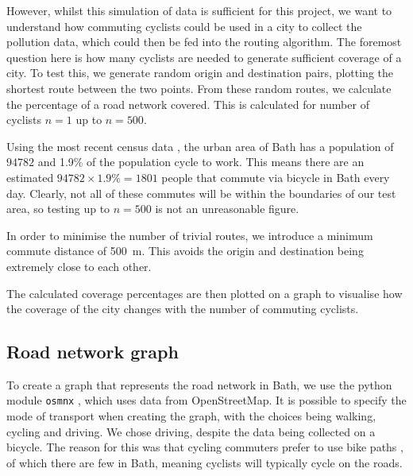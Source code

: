 \documentclass[11pt]{report}
\begin{document}
However, whilst this simulation of data is sufficient for this project, we want to understand how commuting cyclists could be used in a city to collect the pollution data, which could then be fed into the routing algorithm. The foremost question here is how many cyclists are needed to generate sufficient coverage of a city. To test this, we generate random origin and destination pairs, plotting the shortest route between the two points. From these random routes, we calculate the percentage of a road network covered. This is calculated for number of cyclists $n=1$ up to $n=500$.

Using the most recent census data \citep{ons2011census}, the urban area of Bath has a population of $94782$ and 1.9\% of the population cycle to work. This means there are an estimated $94782 \times 1.9\% = 1801$ people that commute via bicycle in Bath every day. Clearly, not all of these commutes will be within the boundaries of our test area, so testing up to $n=500$ is not an unreasonable figure.

In order to minimise the number of trivial routes, we introduce a minimum commute distance of 500~m. This avoids the origin and destination being extremely close to each other.

The calculated coverage percentages are then plotted on a graph to visualise how the coverage of the city changes with the number of commuting cyclists.


\subsection{Road network graph} \label{network_graph}

To create a graph that represents the road network in Bath, we use the python module \texttt{osmnx} \citep{boeing2017osmnx}, which uses data from OpenStreetMap. It is possible to specify the mode of transport when creating the graph, with the choices being walking, cycling and driving. We chose driving, despite the data being collected on a bicycle. The reason for this was that cycling commuters prefer to use bike paths \citep{broach2012wherecyclistsride, skov_petersen2018cyclingpreferences}, of which there are few in Bath, meaning cyclists will typically cycle on the roads.
\end{document}
